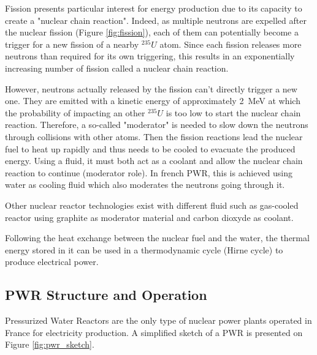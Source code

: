 Fission presents particular interest for energy production due to its capacity to create a "nuclear chain reaction". Indeed, as multiple neutrons are expelled after the nuclear fission (Figure \ref{fig:fission}), each of them can potentially become a trigger for a new fission of a nearby $^{235}U$ atom. Since each fission releases more neutrons than required for its own triggering, this results in an exponentially increasing number of fission called a nuclear chain reaction.

\npar

However, neutrons actually released by the fission can't directly trigger a new one. They are emitted with a kinetic energy of approximately 2~MeV at which the probability of impacting an other $^{235}U$ is too low to start the nuclear chain reaction. Therefore, a so-called "moderator" is needed to slow down the neutrons through collisions with other atoms. Then the fission reactions lead the nuclear fuel to heat up rapidly and thus needs to be cooled to evacuate the produced energy. Using a fluid, it must both act as a coolant and allow the nuclear chain reaction to continue (moderator role). In french PWR, this is achieved using water as cooling fluid which also moderates the neutrons going through it.

\begin{note*}{}
Other nuclear reactor technologies exist with different fluid such as gas-cooled reactor using graphite as moderator material and carbon dioxyde as coolant.
\end{note*}

\npar

Following the heat exchange between the nuclear fuel and the water, the thermal energy stored in it can be used in a thermodynamic cycle (\eg Hirne cycle) to produce electrical power.



\subsection*{PWR Structure and Operation}

Pressurized Water Reactors are the only type of nuclear power plants operated in France for electricity production. A simplified sketch of a PWR is presented on Figure \ref{fig:pwr_sketch}.

